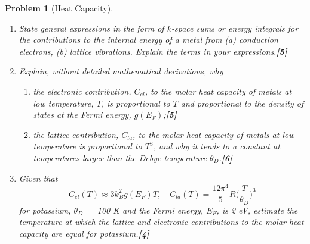 \documentclass[a4paper]{article}
\theoremstyle{new}
\newtheorem{qns}{Problem}[subsection]
\begin{document}
\begin{qns}[Heat Capacity]\leavevmode
\begin{enumerate}[label=(\roman*)]
\item State general expressions in the form of $k$-space sums or energy integrals for the contributions to the internal energy of a metal from (a) conduction electrons, (b) lattice vibrations. Explain the terms in your expressions.\hfill\textbf{[5]}
\item Explain, without detailed mathematical derivations, why 
\begin{enumerate}[label=(\alph*)]
    \item the electronic contribution, $C_{el}$, to the molar heat capacity of metals at low temperature, $T$, is proportional to $T$ and proportional to the density of states at the Fermi energy, $g(E_F)$;\hfill\textbf{[5]}
    \item the lattice contribution, $C_{la}$, to the molar heat capacity of metals at low temperature is proportional to $T^3$, and why it tends to a constant at temperatures larger than the Debye temperature $\theta_D$.\hfill\textbf{[6]}
\end{enumerate}
\item Given that
$$C_{el}(T)\approx 3k_B^2g(E_F)T,\quad C_{la}(T)=\frac{12\pi^4}{5}R\bigg(\frac{T}{\theta_D}\bigg)^3$$
for potassium, $\theta_D=$ 100 K and the Fermi energy, $E_F$, is 2 eV, estimate the temperature at which the lattice and electronic contributions to the molar heat capacity are equal for potassium.\hfill\textbf{[4]}
\end{enumerate}
\end{qns}
\end{document}
